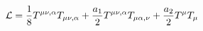 \begin{equation}
{\cal L} = \frac{1}{8} T^{\mu\nu,\alpha} T_{\mu\nu,\alpha} +
\frac{a_1}{2} T^{\mu\nu,\alpha} T_{\mu\alpha,\nu} + \frac{a_2}{2}
T^\mu T_\mu
\end{equation}

